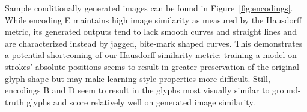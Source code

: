 Sample conditionally generated images can be found in Figure~\ref{fig:encodings}.
While encoding E maintains high image similarity as measured by the Hausdorff metric, its generated outputs tend to lack smooth curves and straight lines and are characterized instead by jagged, bite-mark shaped curves.
This demonstrates a potential shortcoming of our Hausdorff similarity metric: training a model on strokes' absolute positions seems to result in greater preservation of the original glyph shape but may make learning style properties more difficult.
Still, encodings B and D seem to result in the glyphs most visually similar to ground-truth glyphs and score relatively well on generated image similarity.

